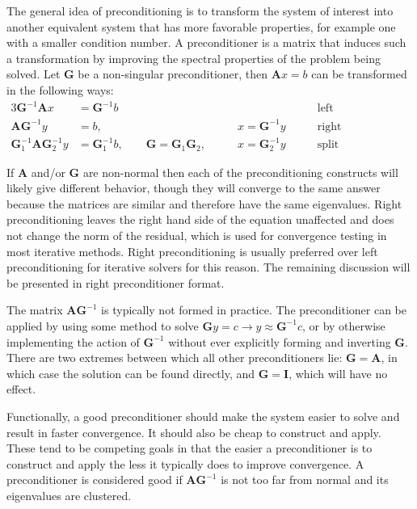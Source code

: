 \documentclass[12pt]{article}
\newcommand{\ve}[1]{\ensuremath{\mathbf{#1}}}
\begin{document}
The general idea of preconditioning is to transform the system of interest into another equivalent system that has more favorable properties, for example one with a smaller condition number. A preconditioner is a matrix that induces such a transformation by improving the spectral properties of the problem being solved. Let $\ve{G}$ be a non-singular preconditioner, then $\ve{A}x=b$ can be transformed in the following ways:%
%
\begin{alignat}{3}
  \ve{G}^{-1}\ve{A}x &= \ve{G}^{-1}b  &  &\text{left preconditioning,} \\
  \ve{AG}^{-1}y &= b, \qquad  &x = \ve{G}^{-1}y \qquad &\text{right preconditioning, and } \\
  \ve{G}_{1}^{-1}\ve{AG}_{2}^{-1}y &= \ve{G}_{1}^{-1}b, \qquad \ve{G} = \ve{G}_{1}\ve{G}_{2}, \qquad  &x = \ve{G}_{2}^{-1}y  \qquad &\text{split preconditioning.} 
\end{alignat}

If $\ve{A}$ and/or $\ve{G}$ are non-normal then each of the preconditioning constructs will likely give different behavior, though they will converge to the same answer because the matrices are similar and therefore have the same eigenvalues. %
Right preconditioning leaves the right hand side of the equation unaffected and does not change the norm of the residual, which is used for convergence testing in most iterative methods. Right preconditioning is usually preferred over left preconditioning for iterative solvers for this reason. %
The remaining discussion will be presented in right preconditioner format. 

The matrix $\ve{A}\ve{G}^{-1}$ is typically not formed in practice. The preconditioner can be applied by using some method to solve $\ve{G}y=c \to y \approx \ve{G}^{-1}c$, or by otherwise implementing the action of $\ve{G}^{-1}$ without ever explicitly forming and inverting $\ve{G}$. There are two extremes between which all other preconditioners lie: $\ve{G} = \ve{A}$, in which case the solution can be found directly, and $\ve{G} = \ve{I}$, which will have no effect.%

Functionally, a good preconditioner should make the system easier to solve and result in faster convergence. It should also be cheap to construct and apply. These tend to be competing goals in that the easier a preconditioner is to construct and apply the less it typically does to improve convergence. A preconditioner is considered good if $\ve{A}\ve{G}^{-1}$ is not too far from normal and its eigenvalues are clustered.%
\end{document}
